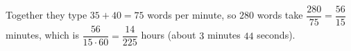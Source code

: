 Together they type $35+40=75$ words per minute, so $280$ words take $\dfrac{280}{75}=\dfrac{56}{15}$ minutes, which is $\dfrac{56}{15\cdot60}=\boxed{\dfrac{14}{225}}$ hours (about $3$ minutes $44$ seconds).
